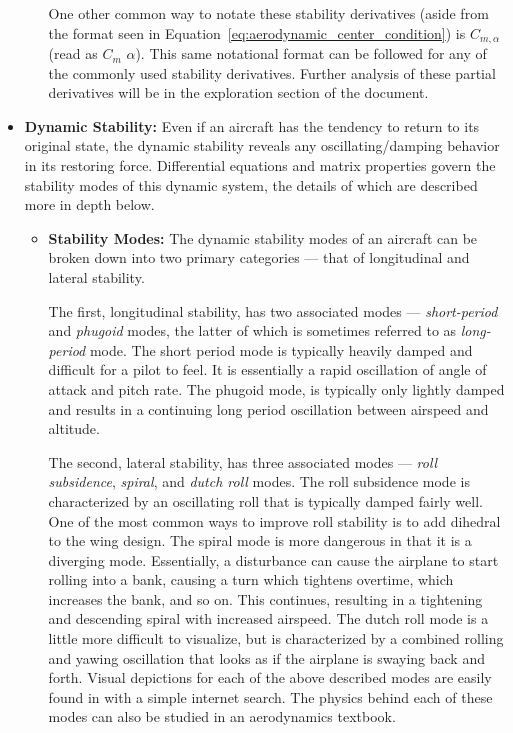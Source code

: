 \documentclass{article}
\begin{document}
\begin{itemize}
\begin{itemize}
            One other common way to notate these stability derivatives (aside from the format seen in Equation~\ref{eq:aerodynamic_center_condition}) is $C_{m,\alpha}$ (read as $C_m$ $\alpha$). 
            This same notational format can be followed for any of the commonly used stability derivatives.
            Further analysis of these partial derivatives will be in the exploration section of the document. 
        \end{itemize}

    \item[] \textbf{Dynamic Stability:} Even if an aircraft has the tendency to return to its original state, the dynamic stability reveals any oscillating/damping behavior in its restoring force.
    Differential equations and matrix properties govern the stability modes of this dynamic system, the details of which are described more in depth below.
        \begin{itemize}
            \item[] \textbf{Stability Modes:} The dynamic stability modes of an aircraft can be broken down into two primary categories --- that of longitudinal and lateral stability.
            
            The first, longitudinal stability, has two associated modes --- \textit{short-period} and \textit{phugoid} modes, the latter of which is sometimes referred to as \textit{long-period} mode. The short period mode is typically heavily damped and difficult for a pilot to feel.
            It is essentially a rapid oscillation of angle of attack and pitch rate. The phugoid mode, is typically only lightly damped and results in a continuing long period oscillation between airspeed and altitude.

            The second, lateral stability, has three associated modes --- \textit{roll subsidence}, \textit{spiral}, and \textit{dutch roll} modes. The roll subsidence mode is characterized by an oscillating roll that is typically damped fairly well. One of the most common ways to improve roll stability is to add dihedral to the wing design.
            The spiral mode is more dangerous in that it is a diverging mode. Essentially, a disturbance can cause the airplane to start rolling into a bank, causing a turn which tightens overtime, which increases the bank, and so on. This continues, resulting in a tightening and descending spiral with increased airspeed.
            The dutch roll mode is a little more difficult to visualize, but is characterized by a combined rolling and yawing oscillation that looks as if the airplane is swaying back and forth. Visual depictions for each of the above described modes are easily found in with a simple internet search.
            The physics behind each of these modes can also be studied in an aerodynamics textbook.



\end{itemize}
\end{itemize}
\end{document}
